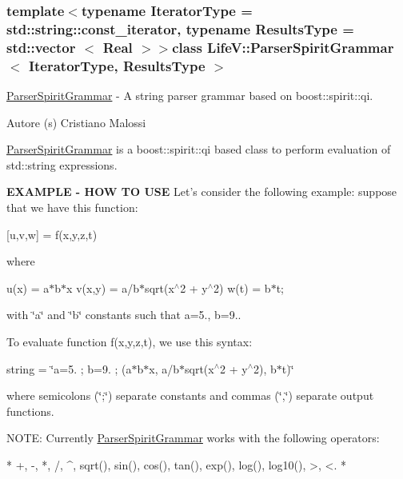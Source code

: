 \subsubsection*{template$<$typename Iterator\-Type = std\-::string\-::const\-\_\-iterator, typename Results\-Type = std\-::vector $<$ Real $>$$>$class Life\-V\-::\-Parser\-Spirit\-Grammar$<$ Iterator\-Type, Results\-Type $>$}

\hyperlink{classLifeV_1_1ParserSpiritGrammar}{Parser\-Spirit\-Grammar} -\/ A string parser grammar based on {\ttfamily boost\-::spirit\-::qi}. 

\begin{DoxyAuthor}{Autore}
(s) Cristiano Malossi
\end{DoxyAuthor}
{\ttfamily \hyperlink{classLifeV_1_1ParserSpiritGrammar}{Parser\-Spirit\-Grammar}} is a {\ttfamily boost\-::spirit\-::qi} based class to perform evaluation of {\ttfamily std\-::string} expressions.

{\bfseries E\-X\-A\-M\-P\-L\-E -\/ H\-O\-W T\-O U\-S\-E} Let's consider the following example\-: suppose that we have this function\-:

\mbox{[}u,v,w\mbox{]} = f(x,y,z,t)

where

u(x) = a$\ast$b$\ast$x v(x,y) = a/b$\ast$sqrt(x$^\wedge$2 + y$^\wedge$2) w(t) = b$\ast$t;

with \char`\"{}a\char`\"{} and \char`\"{}b\char`\"{} constants such that a=5., b=9..

To evaluate function f(x,y,z,t), we use this syntax\-:

string = \char`\"{}a=5. ; b=9. ; (a$\ast$b$\ast$x, a/b$\ast$sqrt(x$^\wedge$2 + y$^\wedge$2), b$\ast$t)\char`\"{}

where semicolons (\char`\"{};\char`\"{}) separate constants and commas (\char`\"{},\char`\"{}) separate output functions.

N\-O\-T\-E\-: Currently \hyperlink{classLifeV_1_1ParserSpiritGrammar}{Parser\-Spirit\-Grammar} works with the following operators\-: \begin{DoxyVerb}*  +, -, *, /, ^, sqrt(), sin(), cos(), tan(), exp(), log(), log10(), >, <.
*  \end{DoxyVerb}
 

